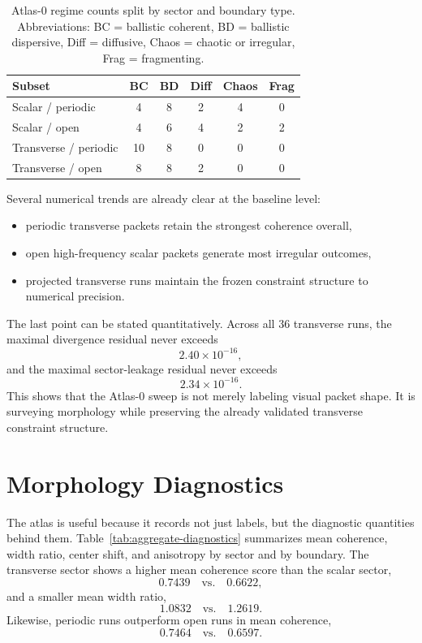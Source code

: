 \documentclass[11pt]{article}
\begin{document}
\begin{table}[t]
\centering
\begin{tabular}{lccccc}
\hline
Subset & BC & BD & Diff & Chaos & Frag \\
\hline
Scalar / periodic & 4 & 8 & 2 & 4 & 0 \\
Scalar / open & 4 & 6 & 4 & 2 & 2 \\
Transverse / periodic & 10 & 8 & 0 & 0 & 0 \\
Transverse / open & 8 & 8 & 2 & 0 & 0 \\
\hline
\end{tabular}
\caption{Atlas-0 regime counts split by sector and boundary type. Abbreviations: BC = ballistic coherent, BD = ballistic dispersive, Diff = diffusive, Chaos = chaotic or irregular, Frag = fragmenting.}
\label{tab:sector-boundary-counts}
\end{table}

Several numerical trends are already clear at the baseline level:
\begin{itemize}
\item periodic transverse packets retain the strongest coherence overall,
\item open high-frequency scalar packets generate most irregular outcomes,
\item projected transverse runs maintain the frozen constraint structure to numerical precision.
\end{itemize}

The last point can be stated quantitatively. Across all 36 transverse runs, the maximal divergence residual never exceeds
\begin{equation}
2.40\times 10^{-16},
\end{equation}
and the maximal sector-leakage residual never exceeds
\begin{equation}
2.34\times 10^{-16}.
\end{equation}
This shows that the Atlas-0 sweep is not merely labeling visual packet shape. It is surveying morphology while preserving the already validated transverse constraint structure.

\section{Morphology Diagnostics}
The atlas is useful because it records not just labels, but the diagnostic quantities behind them. Table~\ref{tab:aggregate-diagnostics} summarizes mean coherence, width ratio, center shift, and anisotropy by sector and by boundary. The transverse sector shows a higher mean coherence score than the scalar sector,
\begin{equation}
0.7439 \quad \text{vs.} \quad 0.6622,
\end{equation}
and a smaller mean width ratio,
\begin{equation}
1.0832 \quad \text{vs.} \quad 1.2619.
\end{equation}
Likewise, periodic runs outperform open runs in mean coherence,
\begin{equation}
0.7464 \quad \text{vs.} \quad 0.6597.
\end{equation}
\end{document}
